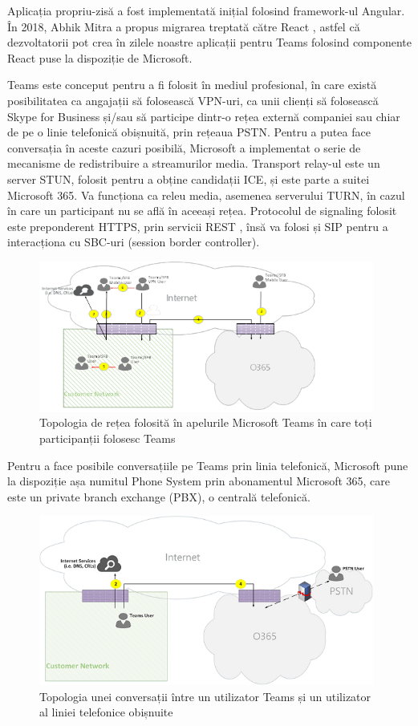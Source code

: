 \indent \par Aplicația propriu-zisă a fost implementată inițial folosind framework-ul Angular. În 2018, Abhik Mitra a propus migrarea treptată către React \cite{TeamsReact2018}, astfel că dezvoltatorii pot crea în zilele noastre aplicații pentru Teams folosind componente React puse la dispoziție de Microsoft.
\indent \par Teams este conceput pentru a fi folosit în mediul profesional, în care există posibilitatea ca angajații să folosească VPN-uri, ca unii clienți să folosească Skype for Business și/sau să participe dintr-o rețea externă companiei sau chiar de pe o linie telefonică obișnuită, prin rețeaua PSTN. Pentru a putea face conversația în aceste cazuri posibilă, Microsoft a implementat o serie de mecanisme de redistribuire a streamurilor media. Transport relay-ul este un server STUN, folosit pentru a obține candidații ICE, și este parte a suitei Microsoft 365. Va funcționa ca releu media, asemenea serverului TURN, în cazul în care un participant nu se află în aceeași rețea. Protocolul de signaling folosit este preponderent HTTPS, prin servicii REST \cite{TeamsFlows2018}, însă va folosi și SIP pentru a interacționa cu SBC-uri (session border controller).
\begin{figure}[!htbp]
    \centering
    \includegraphics[width=11cm]{figures/ms_teams_topology.png}
    \caption{Topologia de rețea folosită în apelurile Microsoft Teams în care toți participanții folosesc Teams \cite{TeamsFlows2018}}
\end{figure}
\indent \par Pentru a face posibile conversațiile pe Teams prin linia telefonică, Microsoft pune la dispoziție așa numitul Phone System prin abonamentul Microsoft 365, care este un private branch exchange (PBX), o centrală telefonică.
\begin{figure}[!htbp]
    \centering
    \includegraphics[width=11cm]{figures/ms_teams_to_pstn.png}
    \caption{Topologia unei conversații între un utilizator Teams și un utilizator al liniei telefonice obișnuite \cite{TeamsFlows2018}}
\end{figure}
